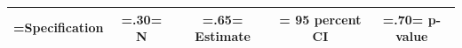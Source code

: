 \begin{tabularx}{\linewidth}{@{}>{\hsize\linewidth=\hsize}Y >{\hsize=.30\hsize\linewidth=\hsize}C >{\hsize=.65\hsize\linewidth=\hsize}C >{\hsize\linewidth=\hsize}C >{\hsize=.70\hsize\linewidth=\hsize}C@{}}
\toprule
\textbf{Specification} & \textbf{N} & \textbf{Estimate} & \textbf{95 percent CI} & \textbf{p-value}\\
\midrule
\bottomrule
\end{tabularx}
